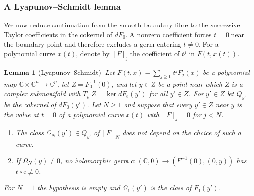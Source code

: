 \documentclass[Threeside,11pt]{article}
\newtheorem{lemma}[theorem]{Lemma}
\theoremstyle{definition}
\theoremstyle{remark}
\numberwithin{equation}{section}
\newcommand{\C}{\mathbb C}\newcommand{\T}{\mathbb T}
\theoremstyle{remark}
\newenvironment{alphalist}{\begin{enumerate}\renewcommand{\labelenumi}{(\alph{enumi})}%
  \renewcommand{\theenumi}{\alph{enumi}}}{\end{enumerate}}
\begin{document}
\subsubsection{A Lyapunov--Schmidt lemma}\label{d4-ls}
{We now reduce continuation from the smooth boundary fibre to the successive
Taylor coefficients in the cokernel of $dF_0$. A nonzero coefficient forces
$t=0$ near the boundary point and therefore excludes a germ entering $t\ne0$.
For a polynomial curve $x(t)$, denote by $[F]_j$ the coefficient of $t^j$ in
$F(t,x(t))$.}

\begin{lemma}[Lyapunov--Schmidt]\label{lem:d4-ls}
Let $F(t,x)=\sum_{j\ge0}t^jF_j(x)$ be a polynomial map $\C\times\C^n\to\C^p$, let
$Z=F_0^{-1}(0)$, and let $y\in Z$ be a point near which $Z$ is a complex submanifold with
$T_{y'}Z=\ker dF_0(y')$ for all $y'\in Z$.  For $y'\in Z$ let $Q_{y'}$ be the cokernel of
$dF_0(y')$.  Let $N\ge1$ and suppose that every $y'\in Z$ near $y$ is the value at $t=0$ of a
polynomial curve $x(t)$ with $[F]_j=0$ for $j<N$.
\begin{alphalist}
  \item The class $\Omega_N(y')\in Q_{y'}$ of $[F]_N$ does not depend on the choice of such a curve.
  \item If $\Omega_N(y)\ne0$, no holomorphic germ $c\colon(\C,0)\to(F^{-1}(0),(0,y))$ has
  $t\circ c\not\equiv0$.
\end{alphalist}
For $N=1$ the hypothesis is empty and $\Omega_1(y')$ is the class of $F_1(y')$.
\end{lemma}
\end{document}
